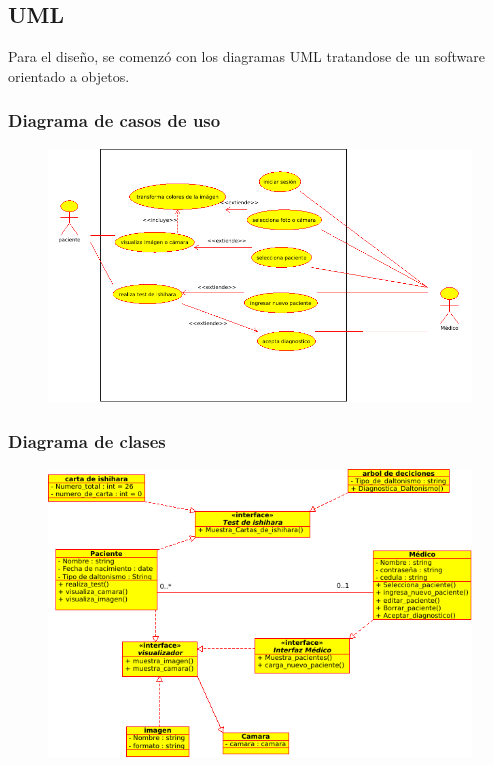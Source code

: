 \documentclass[10pt]{article}
\begin{document}
\subsection{UML}
Para el diseño, se comenzó con los diagramas UML tratandose de un software orientado a objetos.

\subsubsection{Diagrama de casos de uso}

\begin{figure}[H]
	\begin{center}
\includegraphics[scale = 0.60]{UML/casos.png}
	\end{center} 
\end{figure}

\subsubsection{Diagrama de clases}

\begin{figure}[H]
	\begin{center}
\includegraphics[scale = 0.90]{UML/clases.png}
	\end{center} 
\end{figure}
\end{document}
